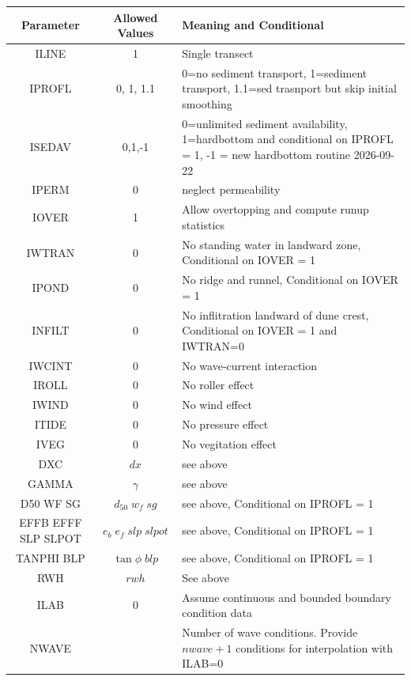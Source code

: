 \documentclass[11pt,oneside]{book}
\begin{document}
\begin{table}[h]
\begin{center}
\begin{tabular}{||c|c|p{8cm}||}\hline
Parameter& Allowed Values   & Meaning and Conditional  \\ \hline \hline
ILINE & 1 & Single transect  \\ \hline
IPROFL & 0, 1, 1.1&  0=no sediment transport, 1=sediment transport, 1.1=sed trasnport but skip initial smoothing\\ \hline
ISEDAV & 0,1,-1 & 0=unlimited sediment availability, 1=hardbottom and conditional on IPROFL = 1, -1 = new hardbottom routine 2026-09-22   \\ \hline
IPERM & 0 & neglect permeability \\ \hline
IOVER & 1 & Allow overtopping and compute runup statistics \\ \hline
IWTRAN & 0 & No standing water in landward zone, Conditional on IOVER = 1 \\ \hline
IPOND & 0 & No ridge and runnel, Conditional on IOVER = 1 \\ \hline
INFILT & 0 & No inflitration landward of dune crest, Conditional on IOVER = 1 and IWTRAN=0 \\ \hline
IWCINT & 0 & No wave-current interaction\\ \hline
IROLL & 0 & No roller effect\\ \hline
IWIND & 0 & No wind effect\\ \hline
ITIDE & 0 & No pressure effect\\ \hline
IVEG & 0 & No vegitation effect\\ \hline
DXC & $dx$ & see above\\ \hline
GAMMA & $\gamma$ & see above\\ \hline
D50 \; WF \; SG & $d_{50} \; w_f \; sg$ & see above, Conditional on IPROFL = 1\\ \hline
EFFB \; EFFF \; SLP \; SLPOT & $ e_{b} \; e_{f} \; slp \; slpot$ & see above, Conditional on IPROFL = 1\\ \hline
TANPHI  BLP & $ \tan \phi  \; blp $ & see above, Conditional on IPROFL = 1\\ \hline
RWH & $rwh$ & See above\\ \hline
ILAB & 0 & Assume continuous and bounded boundary condition data\\ \hline
NWAVE &  & Number of wave conditions. Provide $nwave+1$ conditions for interpolation with ILAB=0\\ \hline

\end{tabular}
\end{center}
\end{table}
\end{document}

